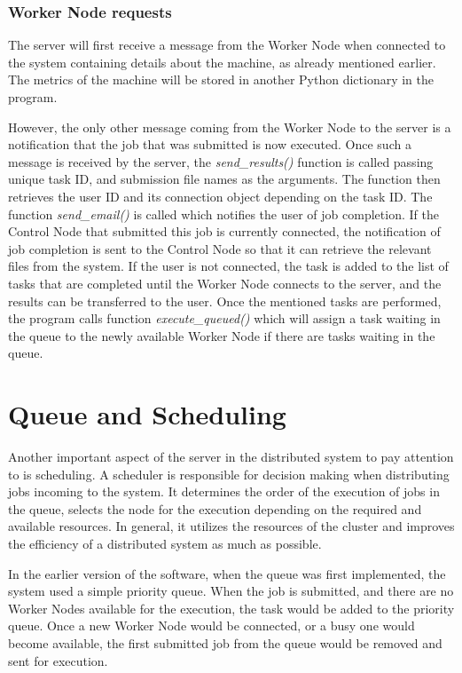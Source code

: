 \documentclass[10pt]{report}
\begin{document}
\subsubsection{Worker Node requests}

The server will first receive a message from the Worker Node when connected to the system containing details about the machine, as already mentioned earlier. The metrics of the machine will be stored in another Python dictionary in the program.
\newline

However, the only other message coming from the Worker Node to the server is a notification that the job that was submitted is now executed. Once such a message is received by the server, the \textit{send\_results()} function is called passing unique task ID, and submission file names as the arguments. The function then retrieves the user ID and its connection object depending on the task ID. The function \textit{send\_email()} is called which notifies the user of job completion. If the Control Node that submitted this job is currently connected, the notification of job completion is sent to the Control Node so that it can retrieve the relevant files from the system. If the user is not connected, the task is added to the list of tasks that are completed until the Worker Node connects to the server, and the results can be transferred to the user. Once the mentioned tasks are performed, the program calls function \textit{execute\_queued()} which will assign a task waiting in the queue to the newly available Worker Node if there are tasks waiting in the queue.

\section{Queue and Scheduling} \label{queueschedule}

Another important aspect of the server in the distributed system to pay attention to is scheduling. A scheduler is responsible for decision making when distributing jobs incoming to the system. It determines the order of the execution of jobs in the queue, selects the node for the execution depending on the required and available resources. In general, it utilizes the resources of the cluster and improves the efficiency of a distributed system as much as possible.
\newline

In the earlier version of the software, when the queue was first implemented, the system used a simple priority queue. When the job is submitted, and there are no Worker Nodes available for the execution, the task would be added to the priority queue. Once a new Worker Node would be connected, or a busy one would become available, the first submitted job from the queue would be removed and sent for execution.
\newline
\end{document}
